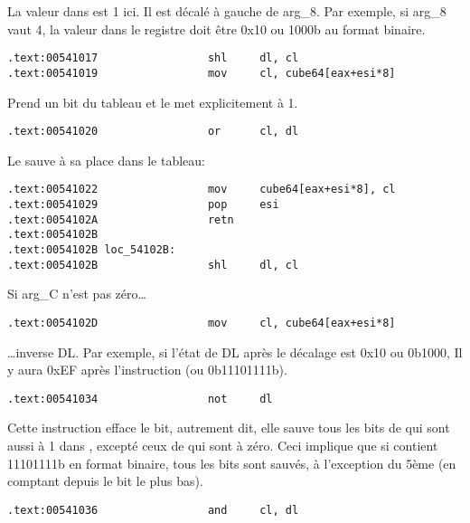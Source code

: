 La valeur dans  est 1 ici. Il est décalé à gauche de arg\_8.
Par exemple, si arg\_8 vaut 4, la valeur dans le registre  doit être 0x10
ou 1000b au format binaire.

\begin{lstlisting}[style=customasmx86]
.text:00541017                 shl     dl, cl
.text:00541019                 mov     cl, cube64[eax+esi*8]
\end{lstlisting}

Prend un bit du tableau et le met explicitement à 1.

\begin{lstlisting}[style=customasmx86]
.text:00541020                 or      cl, dl
\end{lstlisting}

Le sauve à sa place dans le tableau:

\begin{lstlisting}[style=customasmx86]
.text:00541022                 mov     cube64[eax+esi*8], cl
.text:00541029                 pop     esi
.text:0054102A                 retn
.text:0054102B
.text:0054102B loc_54102B:
.text:0054102B                 shl     dl, cl
\end{lstlisting}

Si arg\_C n'est pas zéro\dots

\begin{lstlisting}[style=customasmx86]
.text:0054102D                 mov     cl, cube64[eax+esi*8]
\end{lstlisting}


\dots inverse DL. Par exemple, si l'état de DL après le décalage est 0x10 ou 0b1000,
Il y aura 0xEF après l'instruction \NOT (ou 0b11101111b).

\begin{lstlisting}[style=customasmx86]
.text:00541034                 not     dl
\end{lstlisting}

Cette instruction efface le bit, autrement dit, elle sauve tous les bits de 
qui sont aussi à 1 dans , excepté ceux de  qui sont à zéro.
Ceci implique que si  contient 11101111b en format binaire, tous les bits
sont sauvés, à l'exception du 5ème (en comptant depuis le bit le plus bas).

\begin{lstlisting}[style=customasmx86]
.text:00541036                 and     cl, dl
\end{lstlisting}

